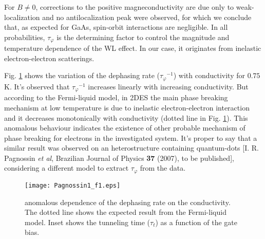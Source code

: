 \documentclass[a4paper,10pt,twocolumn]{memoir}
\newcommand\tauphi{\ensuremath{\tau_\varphi}}
\begin{document}
	For $B \ne 0$, corrections to the positive magneconductivity are due only to weak-localization and no antilocalization peak were observed, for which we conclude that, as expected for GaAs, spin-orbit interactions are negligible. In all probabilities, $\tauphi$ is the determining factor to control the magnitude and temperature dependence of the WL effect. In our case, it originates from inelastic electron-electron scatterings.

	Fig. \ref{fig:1} shows the variation of the dephasing rate ($\tauphi^{-1}$) with conductivity for $0.75$ K. It's observed that $\tauphi^{-1}$ increases linearly with increasing conductivity. But according to the Fermi-liquid model, in 2DES the main phase breaking mechanism at low temperature is due to inelastic electron-electron interaction and it decreases monotonically with conductivity (dotted line in Fig. \ref{fig:1}). This anomalous behaviour indicates the existence of other probable mechanism of phase breaking for electrons in the investigated system. It's proper to say that a similar result was observed on an heterostructure containing quantum-dots [I. R. Pagnossin \textsl{et al}, Brazilian Journal of Physics \textbf{37} (2007), to be published], considering a different model to extract $\tauphi$ from the data.

	\begin{figure}[tb]
		\centering
		\texttt{[image: Pagnossin1\_f1.eps]}
		\caption{anomalous dependence of the dephasing rate on the conductivity. The dotted line shows the expected result from the Fermi-liquid model. Inset shows the tunneling time ($\tau_t$) as a function of the gate bias.}
		\label{fig:1}
	\end{figure}
\end{document}
